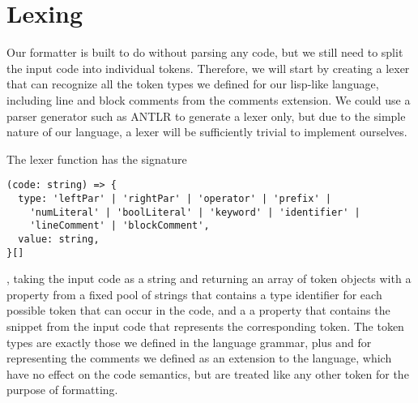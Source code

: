 \section{Lexing}
Our formatter is built to do without parsing any code,
but we still need to split the input code into individual tokens.
Therefore, we will start by creating a lexer that can recognize
all the token types we defined for our lisp-like language,
including line and block comments from the comments extension.
We could use a parser generator such as ANTLR to generate a lexer only,
but due to the simple nature of our language,
a lexer will be sufficiently trivial to implement ourselves.

The lexer function has the signature
\begin{verbatim}
(code: string) => {
  type: 'leftPar' | 'rightPar' | 'operator' | 'prefix' |
    'numLiteral' | 'boolLiteral' | 'keyword' | 'identifier' |
    'lineComment' | 'blockComment',
  value: string,
}[]
\end{verbatim}
, taking the input code as a string and returning an array of
token objects with a property  from a fixed pool of
strings that contains a type identifier
for each possible token that can occur in the code,
and a a property  that contains the
snippet from the input code that represents the corresponding token.
The token types are exactly those we defined in the language grammar,
plus  and 
for representing the comments we defined as an extension to the language,
which have no effect on the code semantics,
but are treated like any other token for the purpose of formatting.


















